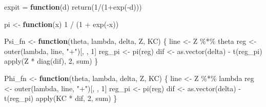 \documentclass[
]{article}
\newenvironment{Shaded}{\begin{snugshade}}{\end{snugshade}}
\newcommand{\ControlFlowTok}[1]{\textcolor[rgb]{0.13,0.29,0.53}{\textbf{#1}}}
\newcommand{\DecValTok}[1]{\textcolor[rgb]{0.00,0.00,0.81}{#1}}
\newcommand{\FunctionTok}[1]{\textcolor[rgb]{0.00,0.00,0.00}{#1}}
\newcommand{\NormalTok}[1]{#1}
\newcommand{\OtherTok}[1]{\textcolor[rgb]{0.56,0.35,0.01}{#1}}
\newcommand{\SpecialCharTok}[1]{\textcolor[rgb]{0.00,0.00,0.00}{#1}}
\newcommand{\StringTok}[1]{\textcolor[rgb]{0.31,0.60,0.02}{#1}}
\begin{document}
\begin{Shaded}
\begin{Highlighting}[]
\NormalTok{expit }\OtherTok{=} \ControlFlowTok{function}\NormalTok{(d) }\FunctionTok{return}\NormalTok{(}\DecValTok{1}\SpecialCharTok{/}\NormalTok{(}\DecValTok{1}\SpecialCharTok{+}\FunctionTok{exp}\NormalTok{(}\SpecialCharTok{{-}}\NormalTok{d)))}

\NormalTok{pi }\OtherTok{\textless{}{-}} \ControlFlowTok{function}\NormalTok{(x) }\DecValTok{1} \SpecialCharTok{/}\NormalTok{ (}\DecValTok{1} \SpecialCharTok{+} \FunctionTok{exp}\NormalTok{(}\SpecialCharTok{{-}}\NormalTok{x))}

\NormalTok{Psi\_fn }\OtherTok{\textless{}{-}} \ControlFlowTok{function}\NormalTok{(theta, lambda, delta, Z, KC) \{}
\NormalTok{  line }\OtherTok{\textless{}{-}}\NormalTok{ Z }\SpecialCharTok{\%*\%}\NormalTok{ theta}
\NormalTok{  reg }\OtherTok{\textless{}{-}} \FunctionTok{outer}\NormalTok{(lambda, line, }\StringTok{"+"}\NormalTok{)[, , }\DecValTok{1}\NormalTok{]}
\NormalTok{  reg\_pi }\OtherTok{\textless{}{-}} \FunctionTok{pi}\NormalTok{(reg)}
\NormalTok{  dif }\OtherTok{\textless{}{-}} \FunctionTok{as.vector}\NormalTok{(delta) }\SpecialCharTok{{-}} \FunctionTok{t}\NormalTok{(reg\_pi)}
  \FunctionTok{apply}\NormalTok{(Z }\SpecialCharTok{*} \FunctionTok{diag}\NormalTok{(dif), }\DecValTok{2}\NormalTok{, sum)}
\NormalTok{\}}

\NormalTok{Phi\_fn }\OtherTok{\textless{}{-}} \ControlFlowTok{function}\NormalTok{(theta, lambda, delta, Z, KC) \{}
\NormalTok{  line }\OtherTok{\textless{}{-}}\NormalTok{ Z }\SpecialCharTok{\%*\%}\NormalTok{ lambda}
\NormalTok{  reg }\OtherTok{\textless{}{-}} \FunctionTok{outer}\NormalTok{(lambda, line, }\StringTok{"+"}\NormalTok{)[, , }\DecValTok{1}\NormalTok{]}
\NormalTok{  reg\_pi }\OtherTok{\textless{}{-}} \FunctionTok{pi}\NormalTok{(reg)}
\NormalTok{  dif }\OtherTok{\textless{}{-}} \FunctionTok{as.vector}\NormalTok{(delta) }\SpecialCharTok{{-}} \FunctionTok{t}\NormalTok{(reg\_pi)}
  \FunctionTok{apply}\NormalTok{(KC }\SpecialCharTok{*}\NormalTok{ dif, }\DecValTok{2}\NormalTok{, sum)}
\NormalTok{\}}


\end{Highlighting}
\end{Shaded}
\end{document}
